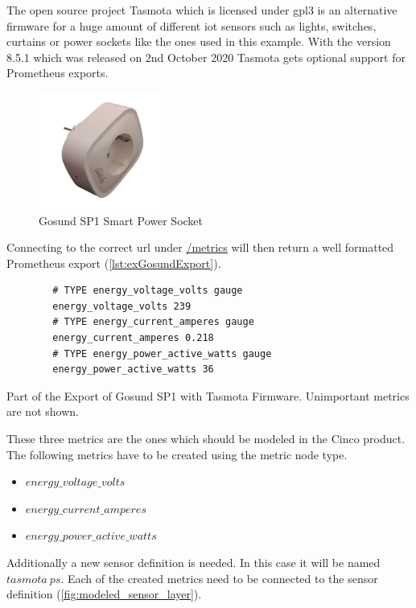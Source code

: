 The open source project Tasmota \cite{tasmotawebsite} which is licensed under \gls{gpl3} is an alternative firmware for a huge amount of different \gls{iot} sensors such as lights, switches, curtains or power sockets like the ones used in this example.
With the version 8.5.1 which was released on 2nd October 2020 Tasmota gets optional support for Prometheus exports. 

\begin{figure}[!ht]
	\centering
	\includegraphics[width=4cm]{assets/images/gosund.png}
	\caption{Gosund SP1 Smart Power Socket}
	\label{fig:gosund_sp1}
\end{figure}

Connecting to the correct \gls{url} under \url{/metrics} will then return a well formatted Prometheus export (\cref{lst:exGosundExport}).

\begin{listing}[!ht]
	\begin{verbatim}
		# TYPE energy_voltage_volts gauge
		energy_voltage_volts 239
		# TYPE energy_current_amperes gauge
		energy_current_amperes 0.218
		# TYPE energy_power_active_watts gauge
		energy_power_active_watts 36
	\end{verbatim}
	\caption{Part of the Export of Gosund SP1 with Tasmota Firmware. Unimportant metrics are not shown.}
	\label{lst:exGosundExport}
\end{listing}

These three metrics are the ones which should be modeled in the Cinco product. The following metrics have to be created using the metric node type. 

\begin{itemize}
	\item $energy\_voltage\_volts$
	\item $energy\_current\_amperes$
	\item $energy\_power\_active\_watts$ 
\end{itemize}

Additionally a new sensor definition is needed. In this case it will be named $tasmota\ ps$. Each of the created metrics need to be connected to the sensor definition (\cref{fig:modeled_sensor_layer}).

